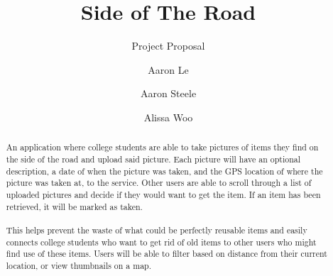 \documentclass[sigconf]{acmart}
\begin{document}
\title{Side of The Road}
\subtitle{Project Proposal}

\author{Aaron Le}

\author{Aaron Steele}

\author{Alissa Woo}

\renewcommand\footnotetextcopyrightpermission[1]{} %
\pagestyle{plain} %

\begin{abstract}
An application where college students are able to take pictures of items they find on the side of the road and upload said picture. Each picture will have an optional description, a date of when the picture was taken, and the GPS location of where the picture was taken at, to the service. Other users are able to scroll through a list of uploaded pictures and decide if they would want to get the item. If an item has been retrieved, it will be marked as taken. \\\\
This helps prevent the waste of what could be perfectly reusable items and easily connects college students who want to get rid of old items to other users who might find use of these items. Users will be able to filter based on distance from their current location, or view thumbnails on a map.
\end{abstract}

\maketitle
\end{document}
